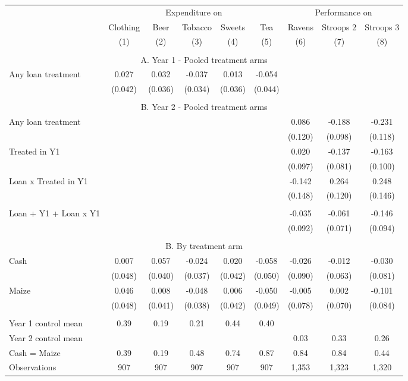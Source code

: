 \begin{tabular}{l cc cc c ccc}
\hline
 & \multicolumn{5}{c}{Expenditure on} & \multicolumn{3}{c}{Performance on} \\  & Clothing & Beer & Tobacco & Sweets & Tea & Ravens & Stroops 2 & Stroops 3  \\ 
 & (1) & (2) & (3) & (4) & (5) & (6) & (7) & (8) \\ 
\hline
 \\ 
\multicolumn{9}{c}{A. Year 1 - Pooled treatment arms} \\ 
Any loan treatment  & 0.027 & 0.032 & -0.037 & 0.013 & -0.054 & & &  \\
  & (0.042) & (0.036) & (0.034) & (0.036) & (0.044) & & &  \\
 \\ 
\multicolumn{9}{c}{B. Year 2 - Pooled treatment arms} \\ 
Any loan treatment & & & & &  & 0.086 & -0.188 & -0.231 \\
  & & & & &  & (0.120) & (0.098) & (0.118) \\
Treated in Y1 & & & & &  & 0.020 & -0.137 & -0.163 \\
 & & & & &  & (0.097) & (0.081) & (0.100) \\
Loan x Treated in Y1 & & & & &  & -0.142 & 0.264 & 0.248 \\
 & & & & &  & (0.148) & (0.120) & (0.146) \\
 \\ 
Loan + Y1 + Loan x Y1 & & & & & & -0.035 & -0.061 & -0.146 \\
 & & & & &  & (0.092) & (0.071) & (0.094) \\
 \\ 
\multicolumn{9}{c}{B. By treatment arm} \\ 
Cash & 0.007 & 0.057 & -0.024 & 0.020 & -0.058 & -0.026 & -0.012 & -0.030 \\
 & (0.048) & (0.040) & (0.037) & (0.042) & (0.050) & (0.090) & (0.063) & (0.081) \\
Maize & 0.046 & 0.008 & -0.048 & 0.006 & -0.050 & -0.005 & 0.002 & -0.101 \\
 & (0.048) & (0.041) & (0.038) & (0.042) & (0.049) & (0.078) & (0.070) & (0.084) \\
 \\ 
\hline
Year 1 control mean & 0.39 & 0.19 & 0.21 & 0.44 & 0.40 &  &  &  \\
Year 2 control mean &  &  &  &  &  & 0.03 & 0.33 & 0.26 \\
Cash = Maize & 0.39 & 0.19 & 0.48 & 0.74 & 0.87 & 0.84 & 0.84 & 0.44 \\
Observations &       907 &       907 &       907 &       907 &       907 &     1,353 &     1,323 &     1,320 \\
\hline
\end{tabular}
